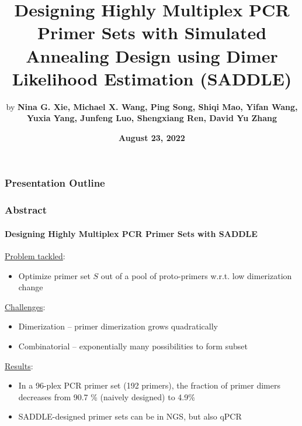\documentclass[xcolor=dvipsnames,envcountsect]{beamer}
\title[Designing Highly Multiplex PCR Primer Sets with SADDLE]{Designing Highly Multiplex PCR Primer Sets with Simulated Annealing Design using Dimer Likelihood Estimation (SADDLE)}
\author [Xie et al. - SADDLE]{by \textbf{Nina G. Xie,  Michael X. Wang, Ping Song, Shiqi Mao, Yifan Wang, Yuxia Yang, Junfeng Luo, Shengxiang Ren, David Yu Zhang}}
\institute[Free University Berlin] {\emph{Presenter: }\textbf{Marie Hoffmann, M.Sc.}\\[1em]
	published 2022/04/11 in Nature Communications, Volume 13, Issue 1\\[1em]
}
\date[August 21, 2022]{\footnotesize\textbf{August 23, 2022}}
\begin{document}
	
\begin{frame}{\titlepage}\end{frame}
\begin{frame}{\frametitle{Presentation Outline}\tableofcontents}\end{frame}
\begin{frame}\frametitle{Abstract}\framesubtitle{Designing Highly Multiplex PCR Primer Sets with SADDLE}
\underline{Problem tackled}:
    \begin{itemize}
        \item Optimize primer set $S$ out of a pool of proto-primers w.r.t. low dimerization change %
    \end{itemize}
\underline{Challenges}:
    \begin{itemize}
        \item Dimerization -- primer dimerization grows quadratically %
        \item Combinatorial -- exponentially many possibilities to form subset 
    \end{itemize}
\underline{Results}:
    \begin{itemize}
        \item In a 96-plex PCR primer set (192 primers), the fraction of primer dimers decreases from 90.7 \% (naively designed) to 4.9\% %
        \item SADDLE-designed primer sets can be in NGS, but also qPCR
    \end{itemize}

\end{frame}
\end{document}
